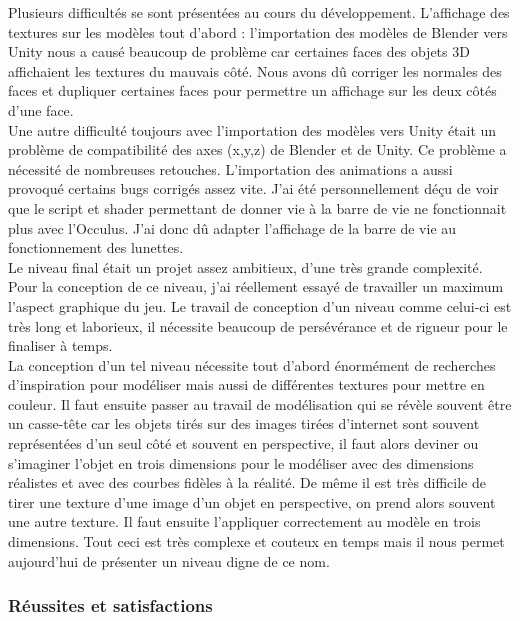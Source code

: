 \documentclass[12pt]{article}
\begin{document}
Plusieurs difficultés se sont présentées au cours du développement. L'affichage des textures sur les modèles tout d'abord : l’importation des modèles de Blender \cite{blender} vers Unity nous a causé beaucoup de problème car certaines faces des objets 3D affichaient les textures du mauvais côté. Nous avons dû corriger les normales des faces et dupliquer certaines faces pour permettre un affichage sur les deux côtés d’une face.\\
Une autre difficulté toujours avec l’importation des modèles vers Unity était un problème de compatibilité des axes (x,y,z) de Blender et de Unity. Ce problème a nécessité de nombreuses retouches. L'importation des animations a aussi provoqué certains bugs corrigés assez vite.
J'ai été personnellement déçu de voir que le script et \gls{shader} permettant de donner vie à la barre de vie ne fonctionnait plus avec l’Occulus. J'ai donc dû adapter l'affichage de la barre de vie au fonctionnement des lunettes.\\
Le niveau final était un projet assez ambitieux, d'une très grande complexité. Pour la conception de ce niveau, j'ai réellement essayé de travailler un maximum l'aspect graphique du jeu. Le travail de conception d’un niveau comme celui-ci est très long et laborieux, il nécessite beaucoup de persévérance et de rigueur pour le finaliser à temps.\\
La conception d’un tel niveau nécessite tout d’abord énormément de recherches d'inspiration pour modéliser mais aussi de différentes textures pour mettre en couleur. Il faut ensuite passer au travail de modélisation qui se révèle souvent être un casse-tête car les objets tirés sur des images tirées d'internet sont souvent représentées d’un seul côté et souvent en perspective, il faut alors deviner ou s'imaginer l'objet en trois dimensions pour le modéliser avec des dimensions réalistes et avec des courbes fidèles à la réalité. De même il est très difficile de tirer une texture d’une image d’un objet en perspective, on prend alors souvent une autre texture. Il faut ensuite l'appliquer correctement au modèle en trois dimensions. Tout ceci est très complexe et couteux en temps mais il nous permet aujourd'hui de présenter un niveau digne de ce nom.

\subsubsection{Réussites et satisfactions}
\end{document}
